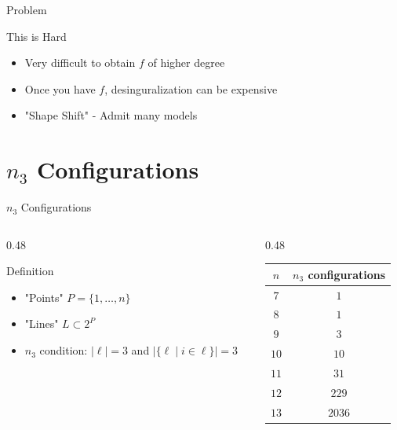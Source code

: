 \documentclass[aspectratio=169]{beamer}
\begin{document}
\begin{frame}{Problem}
    \begin{block}{This is Hard}
        \begin{itemize}
            \item Very difficult to obtain $f$ of higher degree
            \item Once you have $f$, desinguralization can be expensive
            \item "Shape Shift" - Admit many models
        \end{itemize}
    \end{block}
\end{frame}

\section{$n_3$ Configurations}
\begin{frame}{$n_3$ Configurations}
    \begin{columns}[T]
        \begin{column}{0.48\linewidth}
    \begin{block}{Definition}
        \begin{itemize}
            \item "Points" $P = \{1,\dots,n\}$ 
            \item "Lines" $L \subset 2^P$
        \item $n_3$ condition: $|\ell| = 3$ and $|\{\ell \mid i \in \ell\}| = 3$
        \end{itemize}
    \end{block}
    \end{column}
    \begin{column}{0.48\linewidth}
        \begin{tabular}{c | c}
                $n$ &  $n_3$ configurations \\
                \hline
                $7$ & $1$ \\
                $8$ & $1$ \\
                $9$ & $3$ \\
                $10$ & $10$ \\
                $11$ & $31$ \\
                $12$ & $229$ \\
                $13$ & $2036$ \\
        \end{tabular}
    \end{column}
\end{columns}
\end{frame}
\end{document}
